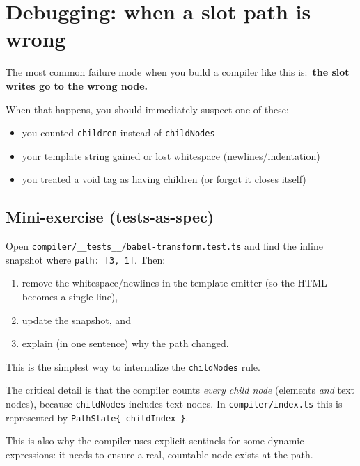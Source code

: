 \section{Debugging: when a slot path is wrong}

The most common failure mode when you build a compiler like this is:\
	\textbf{the slot writes go to the wrong node.}

When that happens, you should immediately suspect one of these:

\begin{itemize}
\item you counted \texttt{children} instead of \texttt{childNodes}
\item your template string gained or lost whitespace (newlines/indentation)
\item you treated a void tag as having children (or forgot it closes itself)
\end{itemize}

\subsection*{Mini-exercise (tests-as-spec)}

Open \texttt{compiler/\_\_tests\_\_/babel-transform.test.ts} and find the inline snapshot where \texttt{path: [3, 1]}.
Then:

\begin{enumerate}
\item remove the whitespace/newlines in the template emitter (so the HTML becomes a single line),
\item update the snapshot, and
\item explain (in one sentence) why the path changed.
\end{enumerate}

This is the simplest way to internalize the \texttt{childNodes} rule.

The critical detail is that the compiler counts \emph{every child node} (elements \emph{and} text nodes), because \texttt{childNodes} includes text nodes. In \texttt{compiler/index.ts} this is represented by \texttt{PathState\{ childIndex \}}.

This is also why the compiler uses explicit sentinels for some dynamic expressions: it needs to ensure a real, countable node exists at the path.

